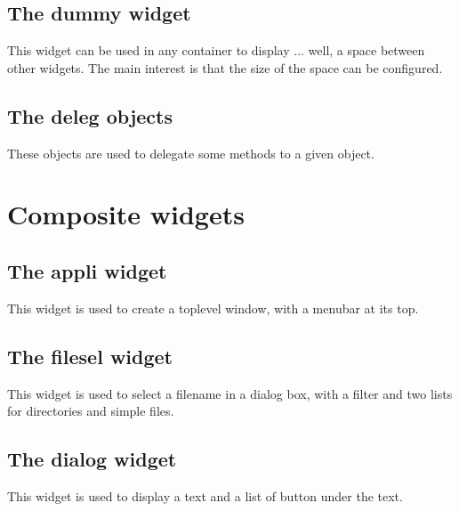 \documentclass{report}
\begin{document}
\subsection{The {\sf dummy} widget}

 This widget can be used in any container to display ... well, a space 
between other widgets. The main interest is that the size of the space can 
be configured.

\subsection{The {\sf deleg} objects}

 These objects are used to delegate some methods to a given object.

\section{Composite widgets}

\subsection{The {\sf appli} widget}

 This widget is used to create a toplevel window, with a menubar at its top.

\subsection{The {\sf filesel} widget}

 This widget is used to select a filename in a dialog box, with a filter 
and two lists for directories and simple files.

\subsection{The {\sf dialog} widget}

 This widget is used to display a text and a list of button under the text.
\end{document}
